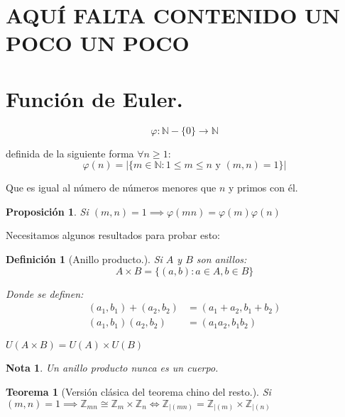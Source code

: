 \documentclass[11pt, a4paper, titlepage]{article}
\theoremstyle{theorem-style}
\newtheorem*{nth}{Teorema}
\newtheorem*{nprop}{Proposición}
\theoremstyle{definition-style}
\newtheorem*{ndef}{Definición}
\theoremstyle{remark-style}
\newtheorem*{nota}{Nota}
\theoremstyle{example-style}
\begin{document}
\section{AQUÍ FALTA CONTENIDO UN POCO UN POCO}


\section{Función de Euler.}
\[
  \varphi : \mathbb{N}-\{0\} \longrightarrow \mathbb{N}  
\]

definida de la siguiente forma $\forall n\ge 1$:
\[
  \varphi(n) = |\{m\in \mathbb{N} : 1\le m \le n \text{ y } (m,n)=1\}|
\]

Que es igual al número de números menores que $n$ y primos con él.

\begin{nprop}
  Si $(m,n) = 1 \implies \varphi(mn) = \varphi(m)\varphi(n)$
\end{nprop}

Necesitamos algunos resultados para probar esto:

\begin{ndef}[Anillo producto.]
Si $A$ y $B$ son anillos:
\[
  A\times B = \{(a,b) : a\in A, b\in B\}
\]

Donde se definen:
\begin{align*}
  (a_1,b_1)+(a_2,b_2) &= (a_1+a_2, b_1+b_2)\\
  (a_1,b_1)(a_2,b_2) &= (a_1a_2, b_1b_2)
\end{align*}

$U(A\times B) = U(A)\times U(B)$

\end{ndef}

\begin{nota} Un anillo producto nunca es un cuerpo.
  
\end{nota}

\begin{nth}[Versión clásica del teorema chino del resto.]
Si $(m,n)=1 \implies \mathbb{Z}_{mn} \cong \mathbb{Z}_m \times \mathbb{Z}_n \iff \mathbb{Z}_{|(mn)} = \mathbb{Z}_{|(m)} \times \mathbb{Z}_{|(n)}$ 
\end{nth}
\end{document}
